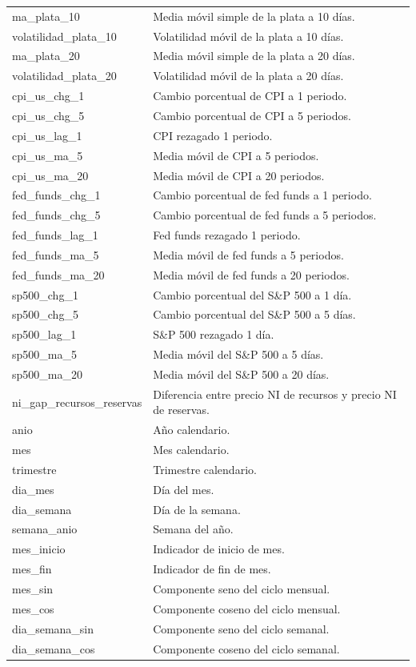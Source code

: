 \documentclass[12pt,letterpaper]{article}
\begin{document}
\begin{longtable}{p{4.2cm}p{10.2cm}}
ma\_plata\_10 & Media móvil simple de la plata a 10 días. \\
volatilidad\_plata\_10 & Volatilidad móvil de la plata a 10 días. \\
ma\_plata\_20 & Media móvil simple de la plata a 20 días. \\
volatilidad\_plata\_20 & Volatilidad móvil de la plata a 20 días. \\
cpi\_us\_chg\_1 & Cambio porcentual de CPI a 1 periodo. \\
cpi\_us\_chg\_5 & Cambio porcentual de CPI a 5 periodos. \\
cpi\_us\_lag\_1 & CPI rezagado 1 periodo. \\
cpi\_us\_ma\_5 & Media móvil de CPI a 5 periodos. \\
cpi\_us\_ma\_20 & Media móvil de CPI a 20 periodos. \\
fed\_funds\_chg\_1 & Cambio porcentual de fed funds a 1 periodo. \\
fed\_funds\_chg\_5 & Cambio porcentual de fed funds a 5 periodos. \\
fed\_funds\_lag\_1 & Fed funds rezagado 1 periodo. \\
fed\_funds\_ma\_5 & Media móvil de fed funds a 5 periodos. \\
fed\_funds\_ma\_20 & Media móvil de fed funds a 20 periodos. \\
sp500\_chg\_1 & Cambio porcentual del S\&P 500 a 1 día. \\
sp500\_chg\_5 & Cambio porcentual del S\&P 500 a 5 días. \\
sp500\_lag\_1 & S\&P 500 rezagado 1 día. \\
sp500\_ma\_5 & Media móvil del S\&P 500 a 5 días. \\
sp500\_ma\_20 & Media móvil del S\&P 500 a 20 días. \\
ni\_gap\_recursos\_reservas & Diferencia entre precio NI de recursos y precio NI de reservas. \\
anio & Año calendario. \\
mes & Mes calendario. \\
trimestre & Trimestre calendario. \\
dia\_mes & Día del mes. \\
dia\_semana & Día de la semana. \\
semana\_anio & Semana del año. \\
mes\_inicio & Indicador de inicio de mes. \\
mes\_fin & Indicador de fin de mes. \\
mes\_sin & Componente seno del ciclo mensual. \\
mes\_cos & Componente coseno del ciclo mensual. \\
dia\_semana\_sin & Componente seno del ciclo semanal. \\
dia\_semana\_cos & Componente coseno del ciclo semanal. \\
\bottomrule
\end{longtable}
\end{document}

